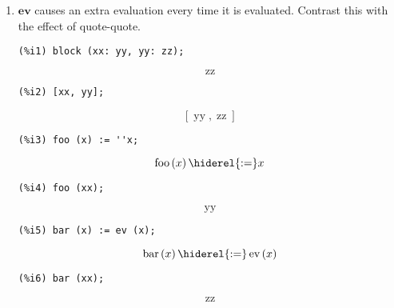 \documentclass[12pt,leqno]{article}
\begin{document}
\begin{enumerate}
\item $\mathbf{ev}$ causes an extra evaluation every time it is evaluated.
Contrast this with the effect of quote-quote.
\begin{verbatim}
(%i1) block (xx: yy, yy: zz);
\end{verbatim}
\begin{dmath}[number={\(\mathop{\mathrm{\%o}_{1}}\)}]
\mathop{\mathrm{zz}}
\end{dmath}
\begin{verbatim}
(%i2) [xx, yy];
\end{verbatim}
\begin{dmath}[number={\(\mathop{\mathrm{\%o}_{2}}\)}]
\left[\mathop{\mathrm{yy}}, \mathop{\mathrm{zz}}\right]
\end{dmath}
\begin{verbatim}
(%i3) foo (x) := ''x;
\end{verbatim}
\begin{dmath}[number={\(\mathop{\mathrm{\%o}_{3}}\)}]
\mathop{\mathrm{foo}}\left(x\right) \hiderel{:=} x
\end{dmath}
\begin{verbatim}
(%i4) foo (xx);
\end{verbatim}
\begin{dmath}[number={\(\mathop{\mathrm{\%o}_{4}}\)}]
\mathop{\mathrm{yy}}
\end{dmath}
\begin{verbatim}
(%i5) bar (x) := ev (x);
\end{verbatim}
\begin{dmath}[number={\(\mathop{\mathrm{\%o}_{5}}\)}]
\mathop{\mathrm{bar}}\left(x\right) \hiderel{:=} \mathop{\mathrm{ev}}\left(x\right)
\end{dmath}
\begin{verbatim}
(%i6) bar (xx);
\end{verbatim}
\begin{dmath}[number={\(\mathop{\mathrm{\%o}_{6}}\)}]
\mathop{\mathrm{zz}}
\end{dmath}



\end{enumerate}
\end{document}
